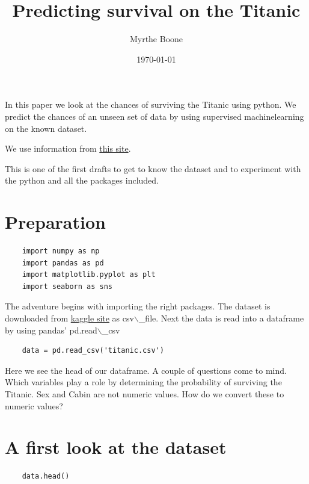 \documentclass[11pt]{article}
\author{Myrthe Boone}
\date{\today}
\title{Predicting survival on the Titanic}
\begin{document}
\tableofcontents

In this paper we look at the chances of surviving the Titanic using
python. We predict the chances of an unseen set of data by using
supervised machinelearning on the known dataset.

We use information from \href{http://www.encyclopedia-titanica.org}{this
site}.

This is one of the first drafts to get to know the dataset and to
experiment with the python and all the packages included.


\section{Preparation}
\label{preparation}
\begin{verbatim}
    import numpy as np
    import pandas as pd
    import matplotlib.pyplot as plt
    import seaborn as sns
\end{verbatim}

The adventure begins with importing the right packages. The dataset is
downloaded from \href{https://www.kaggle.com/c/titanic/data}{kaggle site}
as csv$\backslash$\_file. Next the data is read into a dataframe by using pandas'
pd.read$\backslash$\_csv

\begin{verbatim}
    data = pd.read_csv('titanic.csv')
\end{verbatim}

Here we see the head of our dataframe. A couple of questions come to
mind. Which variables play a role by determining the probability of
surviving the Titanic. Sex and Cabin are not numeric values. How do we
convert these to numeric values?

\section{A first look at the dataset}
\label{a-first-look-at-the-dataset}
\begin{verbatim}
    data.head()
\end{verbatim}
\end{document}
